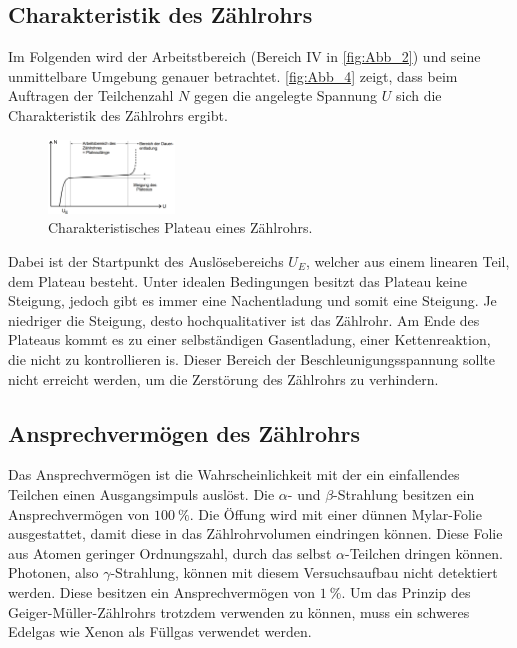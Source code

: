 \subsection{Charakteristik des Zählrohrs}
\label{subsec:Charakteristik}
Im Folgenden wird der Arbeitstbereich (Bereich IV in \autoref{fig:Abb_2}) und seine unmittelbare Umgebung genauer betrachtet.
\autoref{fig:Abb_4} zeigt, dass beim Auftragen der Teilchenzahl $N$ gegen die angelegte Spannung $U$ sich die Charakteristik des Zählrohrs ergibt.
\begin{figure}[H]
    \centering
    \includegraphics[width=0.3\textwidth]{Abbildungen/Abb_4.png}
    \caption{Charakteristisches Plateau eines Zählrohrs.\cite{V703}}
    \label{fig:Abb_4}
\end{figure}
Dabei ist der Startpunkt des Auslösebereichs $U_E$, welcher aus einem linearen Teil, dem Plateau besteht.
Unter idealen Bedingungen besitzt das Plateau keine Steigung, jedoch gibt es immer eine Nachentladung und somit eine 
Steigung. Je niedriger die Steigung, desto hochqualitativer ist das Zählrohr.
Am Ende des Plateaus kommt es zu einer selbständigen Gasentladung, einer Kettenreaktion, die nicht zu kontrollieren is.
Dieser Bereich der Beschleunigungsspannung sollte nicht erreicht werden, um die Zerstörung des Zählrohrs zu verhindern.

\subsection{Ansprechvermögen des Zählrohrs}
\label{subsec:Ansprechvermögen}
Das Ansprechvermögen ist die Wahrscheinlichkeit mit der ein einfallendes Teilchen einen Ausgangsimpuls auslöst.
Die $\alpha$- und $\beta$-Strahlung besitzen ein Ansprechvermögen von $\qty{100}{\percent}$. Die Öffung wird mit einer 
dünnen Mylar-Folie ausgestattet, damit diese in das Zählrohrvolumen eindringen können. Diese Folie aus Atomen
geringer Ordnungszahl, durch das selbst $\alpha$-Teilchen dringen können. Photonen, also $\gamma$-Strahlung, können
mit diesem Versuchsaufbau nicht detektiert werden. Diese besitzen ein Ansprechvermögen von $\qty{1}{\percent}$. Um das Prinzip des 
Geiger-Müller-Zählrohrs trotzdem verwenden zu können, muss ein schweres Edelgas wie Xenon als Füllgas verwendet werden.
